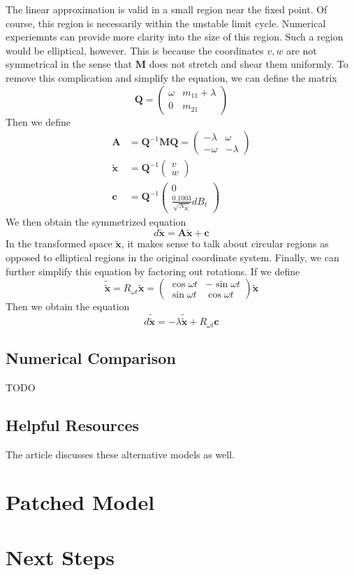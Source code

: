 \documentclass[letterpaper,12pt]{article}
\numberwithin{table}{section}
\numberwithin{figure}{section}
\numberwithin{equation}{section}
\newcommand*{\qvec}[2]{\begin{pmatrix} #1 \\ #2 \end{pmatrix}}
\newcommand*{\qmat}[4]{\begin{pmatrix} #1 & #2 \\ #3 & #4 \end{pmatrix}}
\begin{document}
\begin{flushleft}
    The linear approximation is valid in a small region near the fixed point. Of course, this region is necessarily within the unstable limit cycle. Numerical experiemnts can provide more clarity into the size of this region. Such a region would be elliptical, however. This is because the coordinates $v, w$ are not symmetrical in the sense that $\mathbf{M}$ does not stretch and shear them uniformly. To remove this complication and simplify the equation, we can define the matrix
    \begin{equation}
        \mathbf{Q} = \qmat{\omega}{m_{11} + \lambda}{0}{m_{21}}
    \end{equation}
    Then we define
    \begin{align}
        \mathbf{A} &= \mathbf{Q}^{-1}\mathbf{M}\mathbf{Q} = \qmat{-\lambda}{\omega}{-\omega}{-\lambda} \\
        \tilde{\mathbf{x}} &= \mathbf{Q}^{-1}\qvec{v}{w} \\
        \mathbf{c} &= \mathbf{Q}^{-1} \qvec{0}{\frac{0.1003}{\sqrt{N_K}} dB_t}
    \end{align}
    We then obtain the symmetrized equation
    \begin{equation}
        d\tilde{\mathbf{x}} = \mathbf{A}\tilde{\mathbf{x}} + \mathbf{c}
    \end{equation}
    In the transformed space $\tilde{\mathbf{x}}$, it makes sense to talk about circular regions as opposed to elliptical regions in the original coordinate system. Finally, we can further simplify this equation by factoring out rotations. If we define
    \begin{equation}
        \tilde{\tilde{\mathbf{x}}} = R_{\omega t} \tilde{\mathbf{x}} = \qmat{\cos\omega t}{-\sin\omega t}{\sin\omega t}{\cos\omega t} \tilde{\mathbf{x}}
    \end{equation}
    Then we obtain the equation
    \begin{equation}
        d\tilde{\tilde{\mathbf{x}}} = -\lambda\tilde{\tilde{\mathbf{x}}} + R_{\omega t}\mathbf{c}
    \end{equation}

    \subsection{Numerical Comparison}
    TODO

    \subsection{Helpful Resources}
    The article \cite{dg} discusses these alternative models as well.

    \pagebreak

    \section{Patched Model}

    \section{Next Steps}

    \pagebreak

    
    

\end{flushleft}
\end{document}
